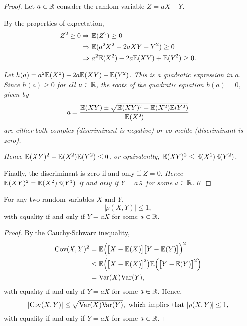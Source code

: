 \begin{proof}
Let $a\in\mathbb{R}$ consider the random variable $Z=aX-Y$. 
\par
By the properties of expectation,
\begin{align*}
Z^2\geq 0 
	& \Rightarrow \mathbb{E}(Z^2)\geq 0  \\
	& \Rightarrow \mathbb{E}(a^2X^2 - 2aXY + Y^2) \geq 0 \\
	& \Rightarrow a^2\mathbb{E}(X^2) - 2a\mathbb{E}(XY) + \mathbb{E}(Y^2) \geq 0.
\end{align*}

\bigskip
\bit
\it Let $h(a)=a^2\mathbb{E}(X^2) - 2a\mathbb{E}(XY) + \mathbb{E}(Y^2)$. This is a quadratic expression in $a$.
\eit
Since $h(a)\geq 0$ for all $a\in\mathbb{R}$, the roots of the quadratic equation $h(a)=0$, given by
\[
a = \frac{\mathbb{E}(XY)\pm\sqrt{\mathbb{E}(XY)^2-\mathbb{E}(X^2)\mathbb{E}(Y^2)}}{\mathbb{E}(X^2)}
\]
are either both complex (discriminant is negative) or co-incide (discriminant is zero). 

\bit
\it Hence $\mathbb{E}(XY)^2-\mathbb{E}(X^2)\mathbb{E}(Y^2) \leq 0$, or equivalently, $\mathbb{E}(XY)^2\leq \mathbb{E}(X^2)\mathbb{E}(Y^2)$.
\eit

Finally, the discriminant is zero if and only if $Z=0$.
\bit
\it Hence $\mathbb{E}(XY)^2=\mathbb{E}(X^2)\mathbb{E}(Y^2)$ if and only if $Y=aX$ for some $a\in\mathbb{R}$.\qed
\eit
\end{proof}

\begin{theorem}\label{thm:correlation}
For any two random variables $X$ and $Y$, 
\[
|\rho(X,Y)|\leq 1,
\]
with equality if and only if $Y=aX$ for some $a\in\mathbb{R}$.
\end{theorem}

\begin{proof}
By the Cauchy-Schwarz inequality,
\begin{align*}
\text{Cov}(X,Y)^2
	& = \mathbb{E}\Big(\big[X-\mathbb{E}(X)\big]\big[Y-\mathbb{E}(Y)\big]\Big)^2 \\
	& \leq \mathbb{E}\Big(\big[X-\mathbb{E}(X)\big]^2\big)\mathbb{E}\Big(\big[Y-\mathbb{E}(Y)\big]^2\Big) \\
	& = \text{Var}(X)\text{Var}(Y),
\end{align*}
with equality if and only if $Y=aX$ for some $a\in\mathbb{R}$. Hence,
\[
|\text{Cov}(X,Y)| \leq \sqrt{\text{Var}(X)\text{Var}(Y)},
\text{ which implies that }
|\rho(X,Y)|	\leq 1,
\]
with equality if and only if $Y=aX$ for some $a\in\mathbb{R}$. 
\end{proof}


